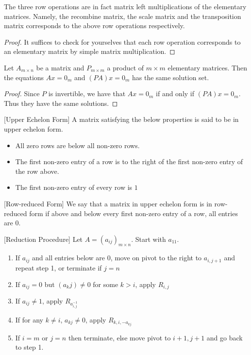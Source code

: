 \begin{thm}{}{} The three row operations are in fact matrix left multiplications of the elementary matrices. Namely, the recombine matrix, the scale matrix and the transposition matrix corresponds to the above row operations respectively. 
\end{thm}
\begin{proof} It suffices to check for yourselves that each row operation corresponds to an elementary matrix by simple matrix multiplication. 
\end{proof}

\begin{thm}{}{} Let $A_{m\times n}$ be a matrix and $P_{m\times m}$ a product of $m\times m$ elementary matrices. Then the equations $Ax=0_m$ and $(PA)x=0_m$ has the same solution set. 
\end{thm}
\begin{proof} Since $P$ is invertible, we have that $Ax=0_m$ if and only if $(PA)x=0_m$. Thus they have the same solutions. 
\end{proof}

\begin{defn}{}{}[Upper Echelon Form] A matrix satisfying the below properties is said to be in upper echelon form. 
\begin{itemize}
\item All zero rows are below all non-zero rows. 
\item The first non-zero entry of a row is to the right of the first non-zero entry of the row above. 
\item The first non-zero entry of every row is $1$
\end{itemize}
\end{defn}

\begin{defn}{}{}[Row-reduced Form] We say that a matrix in upper echelon form is in row-reduced form if above and below every first non-zero entry of a row, all entries are $0$. 
\end{defn}

\begin{defn}{}{}[Reduction Procedure] Let $A=(a_{ij})_{m\times n}$. Start with $a_{11}$. 
\begin{enumerate}
\item If $a_{ij}$ and all entries below are $0$, move on pivot to the right to $a_{i,j+1}$ and repeat step 1, or terminate if $j=n$
\item If $a_{ij}=0$ but $(a_kj)\neq 0$ for some $k>i$, apply $R_{i,j}$
\item If $a_{ij}\neq 1$, apply $R_{a_{i,j}^{-1}}$
\item If for any $k\neq i$, $a_{kj}\neq 0$, apply $R_{k,i,-a_{kj}}$
\item If $i=m$ or $j=n$ then terminate, else move pivot to $i+1,j+1$ and go back to step 1. 
\end{enumerate}
\end{defn}

